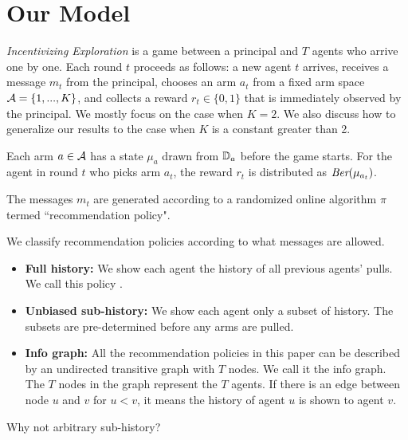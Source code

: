 \section{Our Model}
\label{sec:model}

\emph{Incentivizing Exploration} is a game between a principal and $T$ agents who arrive one by one. Each round $t$ proceeds as follows: a new agent $t$ arrives, receives a message $m_t$ from the principal, chooses an arm $a_t$ from a fixed arm space $\mathcal{A} = \{1,...,K\}$, and collects a reward $r_t\in \{0,1\}$ that is immediately observed by the principal. 
We mostly focus on the case when $K=2$. We also discuss how to generalize our results to the case when $K$ is a constant greater than 2.

Each arm $a \in \mathcal{A}$ has a state $\mu_a$ drawn from $\mathbb{D}_a$ before the game starts. For the agent in round $t$ who picks arm $a_t$, the reward $r_t$ is distributed as $\emph{Ber}(\mu_{a_t})$.

The messages $m_t$ are generated according to a randomized online algorithm $\pi$ termed ``recommendation policy".

 We classify recommendation policies according to what messages are allowed. 
\begin{itemize}
\item \textbf{Full history:} We show each agent the history of all previous agents' pulls. We call this policy \ALGG. 
\item \textbf{Unbiased sub-history:} We show each agent only a subset of history. The subsets are pre-determined before any arms are pulled.  
\item \textbf{Info graph:} All the recommendation policies in this paper can be described by an undirected transitive graph with $T$ nodes. We call it the info graph. The $T$ nodes in the graph represent the $T$ agents. If there is an edge between node $u$ and $v$ for $u < v$, it means the history of agent $u$ is shown to agent $v$.
\end{itemize}

\begin{remark}
Why not arbitrary sub-history?
\end{remark}

